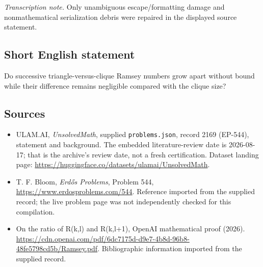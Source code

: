 \documentclass[11pt,a4paper]{article}
\begin{document}
{\small\emph{Transcription note.} Only unambiguous escape/formatting damage and nonmathematical serialization debris were repaired in the displayed source statement.}

\subsection{Short English statement}

Do successive triangle-versus-clique Ramsey numbers grow apart without bound while their difference remains negligible compared with the clique size?

\subsection{Sources}

{\small

\begin{itemize}

\item[\hypertarget{source:2169:1}{S1}] ULAM.AI, \emph{UnsolvedMath}, supplied \texttt{problems.json}, record 2169 (EP-544), statement and background. The embedded literature-review date is 2026-08-17; that is the archive’s review date, not a fresh certification. Dataset landing page: \url{https://huggingface.co/datasets/ulamai/UnsolvedMath}.

\item[\hypertarget{source:2169:2}{S2}] T. F. Bloom, \emph{Erdős Problems}, Problem 544, \url{https://www.erdosproblems.com/544}. Reference imported from the supplied record; the live problem page was not independently checked for this compilation.

\item[\hypertarget{source:2169:3}{S3}] On the ratio of R(k,l) and R(k,l+1), OpenAI mathematical proof (2026). \url{https://cdn.openai.com/pdf/6dc7175d-d9e7-4b8d-96b8-48fe5798cd5b/Ramsey.pdf}. Bibliographic information imported from the supplied record.

\end{itemize}

}

\label{end:2169}
\end{document}
